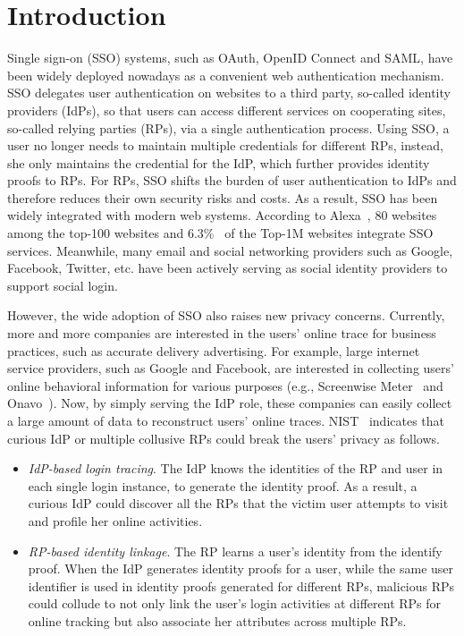 \section{Introduction}
\label{sec:intro}
Single sign-on (SSO) systems, such as OAuth, OpenID Connect and SAML, have been widely deployed nowadays as a convenient web authentication mechanism. SSO delegates user authentication on websites to a third party, so-called identity providers (IdPs), so that users can access different services on cooperating sites, so-called relying parties (RPs), via a single authentication process. Using SSO, a user no longer needs to maintain multiple credentials for different RPs, instead, she only maintains the credential for the IdP, which further provides identity proofs to RPs.
For RPs, SSO shifts the burden of user authentication to IdPs and therefore reduces their own security risks and costs. As a result, SSO has been widely integrated with modern web systems.
According to Alexa~\cite{Alexa}, 80 websites among the top-100 websites and 6.3\%~\cite{GhasemisharifRC18} of the Top-1M websites integrate SSO services.
Meanwhile, many email and social networking providers such as Google, Facebook, Twitter, etc. have been actively serving as social identity providers to support social login.

However, the wide adoption of SSO also raises new privacy concerns. 
Currently, more and more companies are interested in the users' online trace for business practices, such as accurate delivery advertising. For example, large internet service providers, such as Google and Facebook, are interested in collecting users' online behavioral information for various purposes (e.g., Screenwise Meter~\cite{googlenews} and Onavo~\cite{Onavo}). Now, by simply serving the IdP role, these companies can easily collect a large amount of data to reconstruct users' online traces. 
NIST~\cite{NIST2017draft} indicates that curious IdP or multiple collusive RPs could break the users' privacy as follows.
\begin{itemize}
\item {\em IdP-based login tracing}. The IdP knows the identities of the RP and user in each single login instance, to generate the identity proof.
As a result, a curious IdP could discover all the RPs that the victim user attempts to visit and profile her online activities.
\item {\em RP-based identity linkage}. The RP learns a user's identity from the identify proof.
When the IdP generates identity proofs for a user, while the same user identifier is used in identity proofs generated for different RPs, malicious RPs could collude to not only link the user's login activities at different RPs for online tracking but also associate her attributes across multiple RPs.
\end{itemize}

